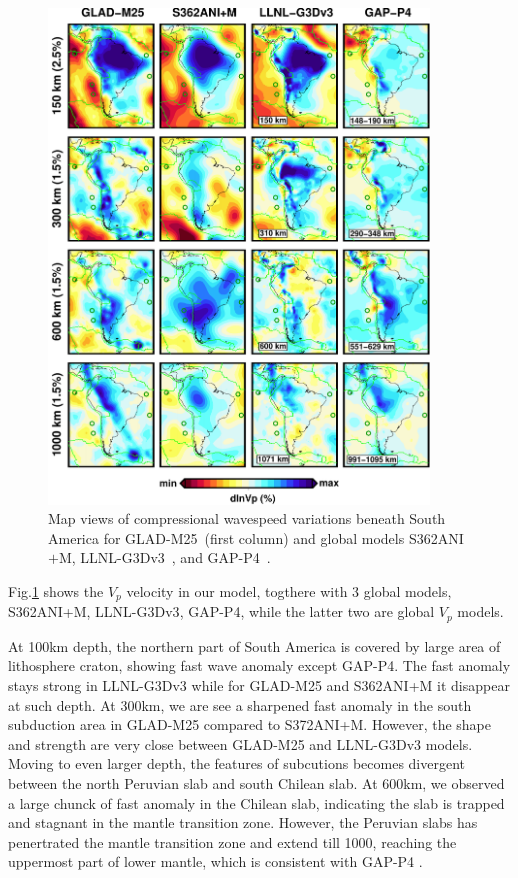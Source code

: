 \documentclass[extra,mreferee]{gji}
\begin{document}
\begin{figure}
\includegraphics[width=0.9\textwidth]{figures/depth_slice/south_america_vp.pdf}
  \caption{Map views of compressional wavespeed variations beneath South America for GLAD-M25~(first column) and global models S362ANI$+$M, LLNL-G3Dv3~\citep{}, and GAP-P4~\citep{fukao2013subducted}.}
\label{fig:southamerica-vp}
\centering
\end{figure}

Fig.\ref{fig:southamerica-vp} shows the $V_p$ velocity in our model, togthere with 3 global models,
S362ANI+M, LLNL-G3Dv3\citep{}, GAP-P4\citep{fukao2013subducted}, while the latter two are
global $V_p$ models.

At 100km depth, the northern part of South America is covered by large area
of lithosphere craton, showing fast wave anomaly except GAP-P4. The fast anomaly
stays strong in LLNL-G3Dv3 while for GLAD-M25
and S362ANI+M it disappear at such depth.
At 300km, we are see a sharpened fast anomaly in the south subduction area
in GLAD-M25 compared to S372ANI+M. However, the shape and strength are very close
between GLAD-M25 and LLNL-G3Dv3 models. Moving to even larger depth, the features of
subcutions becomes divergent between the north Peruvian slab and south Chilean slab.
At 600km, we observed a large chunck of fast anomaly in the Chilean slab,
indicating the slab is trapped and stagnant in the mantle transition zone. However,
the Peruvian slabs has penertrated the mantle transition zone and extend till 1000,
reaching the uppermost part of lower mantle, which is consistent with GAP-P4
\citep{fukao2013subducted}.
\end{document}
